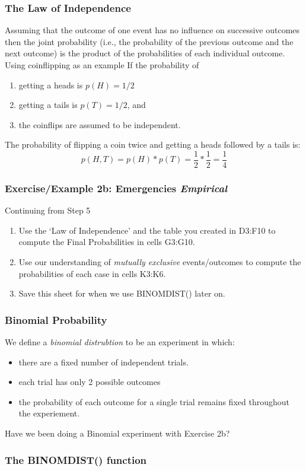 \documentclass[12pt]{beamer}
\begin{document}
	\begin{frame}
		\frametitle{The Law of Independence}
		Assuming that the outcome of one event has no influence on successive outcomes then the joint probability (i.e., the probability of the previous outcome and the next outcome) is the product of the probabilities of each individual outcome.\\ Using coinflipping as an example
		If the probability of
		\begin{enumerate}
			\item getting a heads is $p(H)=1/2$
			\item getting a tails is $p(T)=1/2$, and 
			\item the coinflips are assumed to be independent. 
		\end{enumerate}
		The probability of flipping a coin twice and getting a heads followed by a tails is:
		$$ p(H,T) = p(H)*p(T) = \frac{1}{2} * \frac{1}{2}= \frac{1}{4} $$ 
	
	\end{frame}
	\begin{frame}
		\frametitle{Exercise/Example 2b: Emergencies \textit{Empirical}}
		Continuing from Step 5 
		\begin{enumerate}
			\item Use the `Law of Independence' and the table you created in D3:F10 to compute the Final Probabilities in cells G3:G10.
			\item Use our understanding of \textit{mutually exclusive} events/outcomes to compute the probabilities of each case in cells K3:K6.
			\item Save this sheet for when we use BINOMDIST() later on.
		\end{enumerate}
	\end{frame}
	\begin{frame}
		\frametitle{Binomial Probability}
		We define a \textit{binomial distrubtion} to be an experiment in which:
		\begin{itemize}
			\item there are a fixed number of independent trials. 
			\item each trial has only 2 possible outcomes
			\item the probability of each outcome for a single trial remains fixed throughout the experiement.
		\end{itemize}
	Have we been doing a Binomial experiment with Exercise 2b? 
	\end{frame}
	\begin{frame}
		\frametitle{The BINOMDIST() function}
	\end{frame}
\end{document}
